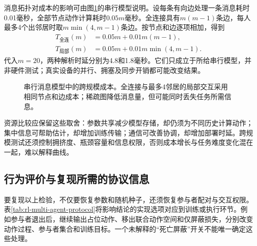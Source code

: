 消息拓扑对成本的影响可由图\ref{fig:rl-multi-agent-scaling}的串行模型说明。设每条有向边处理一条消息耗时0.01毫秒，全部节点动作计算耗时$0.05m$毫秒。全连接具有$m(m-1)$条边，每人最多4个出邻居时取$m\min(4,m-1)$条边。按节点和边逐项相加，得到
\[
 \begin{aligned}
 T_{\text{全连}}(m)&=0.05m+0.01m(m-1),\\
 T_{\text{局部}}(m)&=0.05m+0.01m\min(4,m-1).
 \end{aligned}
\]
代入$m=20$，两种解析时延分别为4.8和1.8毫秒。它们只成立于所给串行模型，并非硬件测试；真实设备的并行、拥塞及同步开销都可能改变结果。

\begin{figure}[htbp]
 \centering
 
 \caption{串行消息模型中的跨规模成本。全连接与最多4邻居的局部交互采用相同节点和边成本；稀疏图降低消息量，但可能同时丢失任务所需信息。}
 \label{fig:rl-multi-agent-scaling}
\end{figure}

资源比较应保留这些取舍：参数共享减少模型存储，却仍须为不同历史计算动作；集中信息可帮助估计，却增加训练传输；通信可改善协调，却增加部署时延。跨规模测试还须控制拥挤度、瓶颈容量和信息权限，否则成本增长与任务难度变化混在一起，难以解释曲线。

\subsection{行为评价与复现所需的协议信息}
\label{sec:rl-multi-agent-protocol}

要复现以上检验，不仅要恢复参数和随机种子，还须恢复参与者配对与交互权限。表\ref{tab:rl-multi-agent-protocol}将影响结论的实现选项对应到训练或执行环节。例如参与者退出后，继续输出占位动作、移出联合动作空间和仅屏蔽损失，分别改变动作过程、参与者集合和训练目标。一个未解释的“死亡屏蔽”开关不能唯一确定这些处理。

